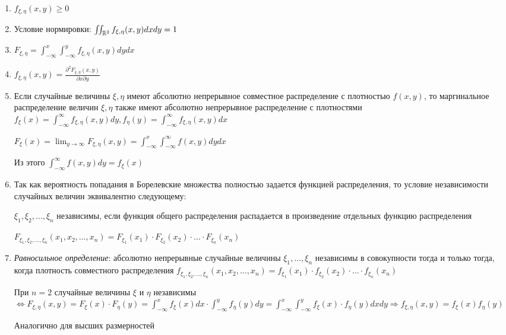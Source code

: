 \documentclass[12pt]{article}
\begin{document}
    \begin{enumerate}
        \item $f_{\xi, \eta}(x, y) \geq 0$
        \item Условие нормировки: $\iint_{\mathbb{R}^2} f_{\xi, \eta}(x, y) dxdy = 1$
        \item $F_{\xi, \eta} = \int_{-\infty}^x \int_{-\infty}^y f_{\xi, \eta}(x, y) dydx$

        \item $f_{\xi, \eta}(x, y) = \frac{\partial^2 F_{\xi, \eta}(x, y)}{\partial x \partial y}$
        
        \item Если случайные величины $\xi, \eta$ имеют абсолютно непрерывное совместное распределение с плотностью $f(x, y)$, 
        то маргинальное распределение величин $\xi, \eta$ также имеют абсолютно непрерывное распределение
        с плотностями $f_\xi(x) = \int_{-\infty}^\infty f_{\xi, \eta}(x, y) dy, f_\eta(y) = \int_{-\infty}^\infty f_{\xi, \eta}(x, y) dx$

        \begin{MyProof}
            $F_{\xi}(x) = \lim_{y \to \infty} F_{\xi, \eta}(x, y) = \int_{-\infty}^x \int_{-\infty}^\infty f(x, y) dydx$

            Из этого $\int_{-\infty}^\infty f(x, y) dy = f_\xi(x)$
        \end{MyProof}

        \item Так как вероятность попадания в Борелевские множества полностью задается функцией распределения, 
        то условие независимости случайных величин эквивалентно следующему:

        $\xi_1, \xi_2, \dots, \xi_n$ независимы, если функция общего распределения распадается в произведение 
        отдельных функцию распределения
    
        $F_{\xi_1, \xi_2, \dots, \xi_n}(x_1, x_2, \dots, x_n) = F_{\xi_1}(x_1) \cdot F_{\xi_2}(x_2) \cdot \dots \cdot F_{\xi_n}(x_n)$

        \item \textit{Равносильное определение}: абсолютно непрерывные случайные величины $\xi_1, \dots, \xi_n$ независимы в совокупности тогда и только тогда, 
        когда плотность совместного распределения $f_{\xi_1, \xi_2, \dots, \xi_n}(x_1, x_2, \dots, x_n) = f_{\xi_1}(x_1) \cdot f_{\xi_2}(x_2) \cdot \dots \cdot f_{\xi_n}(x_n)$
    
        \begin{MyProof}
            При $n = 2$ случайные величины $\xi$ и $\eta$ независимы $\Longleftrightarrow F_{\xi, \eta}(x, y) = F_\xi(x) \cdot F_\eta(y) = \int_{-\infty}^x f_\xi(x) dx \cdot \int_{-\infty}^y f_\eta(y) dy = \int_{-\infty}^x \int_{-\infty}^y f_\xi(x) \cdot f_\eta(y) dxdy \Longrightarrow f_{\xi,\eta}(x, y) = f_\xi(x)f_\eta(y)$

            Аналогично для высших размерностей
        \end{MyProof}

    \end{enumerate}
\end{document}
